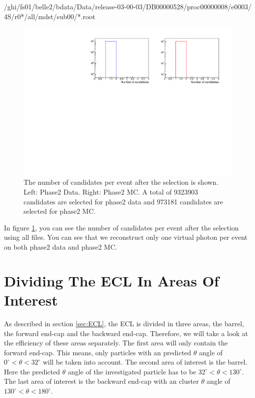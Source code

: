 \documentclass[a4paper,11pt,twosided,final,german,openbib,pdftex,listof=totoc,bibliography=totoc]{scrbook}
\begin{document}
/ghi/fs01/belle2/bdata/Data/release-03-00-03/DB00000528/proc00000008/e0003/ 4S/r0*/all/mdst/sub00/*.root
\newline



\begin{figure}[h!]
	\includegraphics[width=\textwidth]{Plots/master/CCand.pdf}
	\caption[Total Number Of Events After The Selection]{The number of candidates per event after the selection is shown. Left: Phase2 Data. Right: Phase2 MC. A total of 9323903 candidates are selected for phase2 data and 973181 candidates are selected for phase2 MC.}
	\label{fig:nCandAS}
\end{figure}


In figure \ref{fig:nCandAS}, you can see the number of candidates per event after the selection using all files. You can see that we reconstruct only one virtual photon per event on both phase2 data and phase2 MC.


\section{Dividing The ECL In Areas Of Interest}
\label{sec:DivECL}

As described in section \ref{sec:ECL}, the ECL is divided in three areas, the barrel, the forward end-cap and the backward end-cap. Therefore, we will take a look at the efficiency of these areas separately. The first area will only contain the forward end-cap. This means, only particles with an predicted $\theta$ angle of $0^\circ <\theta<32^\circ$ will be taken into account. The second area of interest is the barrel. Here the predicted $\theta$ angle of the investigated particle has to be $32^\circ < \theta < 130^\circ$. The last area of interest is the backward end-cap with an cluster $\theta$ angle of $130^\circ <\theta < 180^\circ$.  
\end{document}
